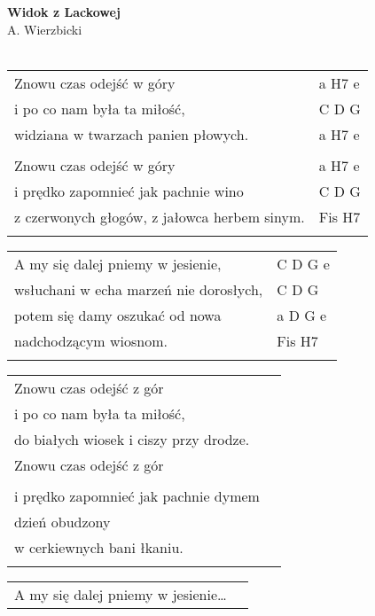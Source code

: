 \documentclass[a5paper]{article}
\begin{document}


\noindent
\fontsize{12pt}{15pt}\selectfont
\textbf{Widok z Lackowej} \\
\fontsize{8pt}{10pt}\selectfont
A. Wierzbicki \\ \\
\fontsize{10pt}{12pt}\selectfont
{}
\begin{tabular}{@{}p{8.50cm}p{3cm}@{}}
\noindent
Znowu czas odejść w góry & a H7 e \\
i po co nam była ta miłość, & C D G \\
widziana w twarzach panien płowych. & a H7 e \\ \\
Znowu czas odejść w góry & a H7 e \\
i prędko zapomnieć jak pachnie wino & C D G \\
z czerwonych głogów, z jałowca herbem sinym. & Fis H7 \\ \\
\end{tabular}

\noindent
\begin{tabular}{@{}p{7.50cm}p{3cm}@{}}
A my się dalej pniemy w jesienie, & C D G e \\
wsłuchani w echa marzeń nie dorosłych, & C D G \\
potem się damy oszukać od nowa & a D G e \\
nadchodzącym wiosnom. & Fis H7 \\ \\
\end{tabular}

\noindent
\begin{tabular}{@{}p{7.50cm}p{3cm}@{}}
Znowu czas odejść z gór \\
i po co nam była ta miłość, \\
do białych wiosek i ciszy przy drodze. \\
Znowu czas odejść z gór \\ \\
i prędko zapomnieć jak pachnie dymem \\
dzień obudzony \\
w cerkiewnych bani łkaniu. \\ \\
\end{tabular}

\noindent
\begin{tabular}{@{}p{7.50cm}p{3cm}@{}}
A my się dalej pniemy w jesienie…
\end{tabular}
\end{document}
